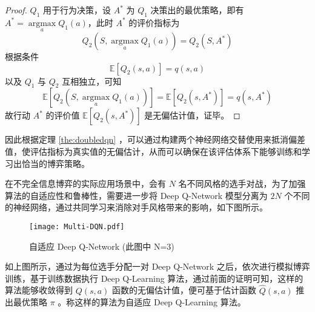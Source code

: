 \begin{proof}
    $Q_1$ 用于行为决策，设 $A^*$ 为 $Q_1$ 决策出的最优策略，即有 $A^*=\mathop{\arg\max}\limits_aQ_1(a)$，此时 $A^*$ 的评价指标为
    \begin{equation}
        Q_2(S,\mathop{\arg\max}\limits_aQ_1(a)) = Q_2(S,A^*)
    \end{equation}
    根据条件
    \begin{equation}
        \mathbb{E}\left[Q_2(s,a)\right] = q(s,a)
    \end{equation}
    以及 $Q_1$ 与 $Q_2$ 互相独立，可知
    \begin{equation}
        \mathbb{E}\left[Q_2(S,\mathop{\arg\max}\limits_aQ_1(a))\right]=\mathbb{E}\left[Q_2(s,A^*)\right]=q(s,A^*)
    \end{equation}
    故行动 $A^*$ 的评价值 $\mathbb{E}\left[Q_2(s,A^*)\right]$ 是无偏估计值，证毕。
\end{proof}

因此根据定理 \ref{the:doubledqn} ，可以通过构建两个神经网络交替使用来抵消偏差值，使评估指标为真实值的无偏估计，从而可以确保在该评估体系下能够训练和学习出恰当的博弈策略。

在不完全信息博弈的实际应用场景中，会有 $N$ 名不同风格的选手对战，为了加强算法的自适应性和鲁棒性，需要进一步将 Deep Q-Network 模型分离为 $2N$ 个不同的神经网络，通过共同学习来消除对手风格带来的影响，如下图所示。

\begin{figure}[H]
    \centering
    \texttt{[image: Multi-DQN.pdf]}
    \caption{自适应 Deep Q-Network (此图中 N=3)}
\end{figure}

如上图所示，通过为每位选手分配一对 Deep Q-Network 之后，依次进行模拟博弈训练，基于训练数据执行 Deep Q-Learning 算法，通过前面的证明可知，这样的算法能够收敛得到 $Q(s,a)$ 函数的无偏估计值，便可基于估计函数 $\widehat{Q}(s,a)$ 推出最优策略 $\pi$ 。称这样的算法为{\jiacu 自适应 Deep Q-Learning 算法}。
